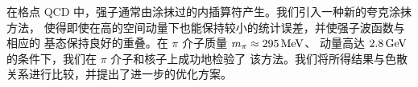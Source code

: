 在格点 QCD 中，强子通常由涂抹过的内插算符产生。我们引入一种新的夸克涂抹方法，
使得即使在高的空间动量下也能保持较小的统计误差，并使强子波函数与相应的
基态保持良好的重叠。在 $\pi$ 介子质量 $m_{\pi}\approx 295\,\textmd{MeV}$、
动量高达 $2.8\,\textmd{GeV}$ 的条件下，我们在 $\pi$ 介子和核子上成功地检验了
该方法。我们将所得结果与色散关系进行比较，并提出了进一步的优化方案。
